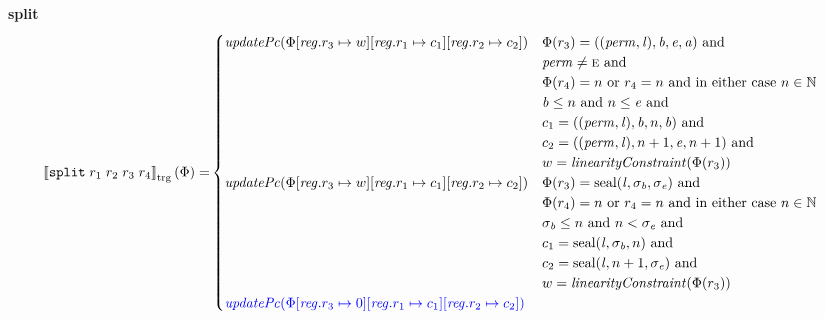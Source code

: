 \documentclass[a4paper]{article}
\newcommand{\sem}[1]{\left\llbracket #1 \right\rrbracket}
\newcommand{\tsem}[2][\Phi]{\sem{#2}_{\mathrm{trg}}(#1)}
\newcommand{\tand}{\text{ and }}
\newcommand{\tor}{\text{ or }}
\newcommand{\sourcecolor}[1]{\color{blue}}
\newcommand{\src}[1]{{\sourcecolor{} #1}}
\newcommand{\targetcolor}[1]{\color{black}}
\newcommand{\trg}[1]{{\targetcolor{} #1}}
\newcommand{\zinstr}[1]{\texttt{#1}}
\newcommand{\fourinstr}[5]{
  \ifthenelse{\equal{#2#3#4#5}{}}
  {\zinstr{#1}}
  {\zinstr{#1} \; #2 \; #3 \; #4 \; #5}
}
\newcommand{\tsplit}[4]{\fourinstr{\trg{split}}{#1}{#2}{#3}{#4}}
\newcommand{\nats}{\mathbb{N}}
\newcommand{\update}[2]{[#1 \mapsto #2]}
\newcommand{\updReg}[2]{\update{\reg.#1}{#2}}
\newcommand{\shareddom}[1]{\mathrm{#1}}
\newcommand{\perm}{\var{perm}}
\newcommand{\lin}{\var{l}}
\newcommand{\seal}[1]{\shareddom{seal}(#1)}
\newcommand{\var}[1]{\mathit{#1}}
\newcommand{\reg}{\var{reg}}
\newcommand{\baddr}{\var{b}}
\newcommand{\eaddr}{\var{e}}
\newcommand{\aaddr}{\var{a}}
\newcommand{\plainperm}[1]{\textsc{#1}}
\newcommand{\enter}{\plainperm{e}}
\newcommand{\plainfun}[2]{
  \ifthenelse{\equal{#2}{}}
  {\mathit{#1}}
  {\mathit{#1}(#2)}
}
\newcommand{\updPcAddr}[1]{\plainfun{updatePc}{#1}}
\newcommand{\linCons}[1]{\plainfun{linearityConstraint}{#1}}
\begin{document}
\textbf{split}\\
\begin{align*}
  \tsem{\tsplit{r_1}{r_2}{r_3}{r_4}} = &
                               \begin{cases}
                                 \updPcAddr{\Phi\updReg{r_3}{w}\updReg{r_1}{c_1}\updReg{r_2}{c_2}} &
                                 \arraycolsep=0pt
                                 \begin{array}[t]{l}
                                   \Phi(r_3) = ((\perm,\lin),\baddr,\eaddr,\aaddr) \tand \\
                                   \perm \neq \enter \tand \\
                                   \Phi(r_4) = n \tor r_4 = n \text{ and in either case } n \in \nats \\
                                   \baddr \leq n \tand n \leq \eaddr \tand \\
                                   c_1 = ((\perm,\lin),\baddr,n,\baddr) \tand \\
                                   c_2 = ((\perm,\lin),n+1,\eaddr,n+1) \tand \\
                                   w = \linCons{\Phi(r_3)}
                                 \end{array}\\
                                 \updPcAddr{\Phi\updReg{r_3}{w}\updReg{r_1}{c_1}\updReg{r_2}{c_2}} &
                                 \arraycolsep=0pt
                                 \begin{array}[t]{l}
                                   \Phi(r_3) = \seal{\lin,\sigma_\baddr,\sigma_\eaddr} \tand \\
                                   \Phi(r_4) = n \tor r_4 = n \text{ and in either case } n \in \nats \\
                                   \sigma_\baddr \leq n \tand n < \sigma_\eaddr \tand \\
                                   c_1 = \seal{\lin,\sigma_\baddr,n} \tand \\
                                   c_2 = \seal{\lin,n+1,\sigma_\eaddr} \tand \\
                                   w = \linCons{\Phi(r_3)}
                                 \end{array}\\
                                 \src{\updPcAddr{\Phi\updReg{r_3}{0}\updReg{r_1}{c_1}\updReg{r_2}{c_2}}} &
                                 \arraycolsep=0pt

\end{cases}
\end{align*}
\end{document}
